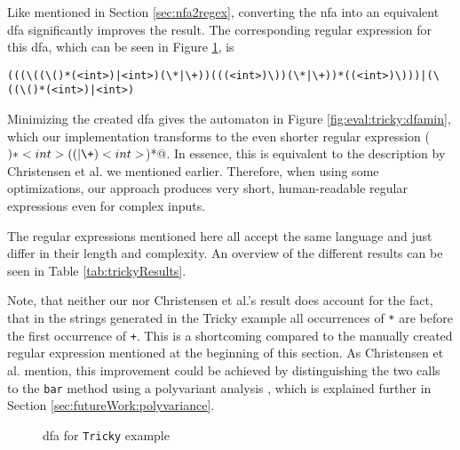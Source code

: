 Like mentioned in Section \ref{sec:nfa2regex}, converting the \ac{nfa} into an equivalent \ac{dfa} significantly improves the result. The corresponding regular expression for this \ac{dfa}, which can be seen in Figure \ref{fig:eval:tricky:dfa}, is 
\begin{Verbatim}[breaklines=true, breakanywhere=true]
(((\((\()*(<int>)|<int>)(\*|\+))(((<int>)\))(\*|\+))*((<int>)\)))|(\((\()*(<int>)|<int>)
\end{Verbatim}

Minimizing the created \ac{dfa} gives the automaton in Figure \ref{fig:eval:tricky:dfamin}, which our implementation transforms to the even shorter regular expression \Verb@(\()*<int>((\*|\+)<int>\))*@. In essence, this is equivalent to the description by Christensen et al. we mentioned earlier.
Therefore, when using some optimizations, our approach produces very short, human-readable regular expressions even for complex inputs.

The regular expressions mentioned here all accept the same language and just differ in their length and complexity. An overview of the different results can be seen in Table \ref{tab:trickyResults}.

Note, that neither our nor Christensen et al.'s result does account for the fact, that in the strings generated in the Tricky example all occurrences of \lstinline|*| are before the first occurrence of \lstinline|+|. This is a shortcoming compared to the manually created regular expression mentioned at the beginning of this section.
As Christensen et al. mention, this improvement could be achieved by distinguishing the two calls to the \lstinline|bar| method using a polyvariant analysis \cite{brics}, which is explained further in Section \ref{sec:futureWork:polyvariance}.

\begin{figure}
	\caption{\ac{dfa} for \lstinline|Tricky| example}
	\label{fig:eval:tricky:dfa}
\end{figure}

